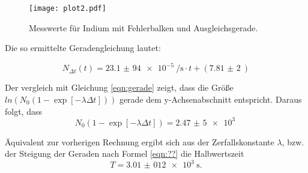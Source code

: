 \begin{figure}[H]
  \centering
  \texttt{[image: plot2.pdf]}
  \caption{Messwerte für Indium mit Fehlerbalken und Ausgleichsgerade.}
  \label{fig:plot2}
\end{figure}

Die so ermittelte Geradengleichung lautet:

\begin{equation*}
  N_{\Delta t}(t)=\SI{23,1(94)e-5}{\per\s}\cdot t + (\SI{7,81(2)}{})
\end{equation*}

Der vergleich mit Gleichung \ref{eqn:gerade} zeigt, dass die Größe
$ln(N_0(1-\exp{[-\lambda\Delta t]}))$ gerade dem y-Achsenabschnitt entspricht.
Daraus folgt, dass
\begin{equation*}
  N_0(1-\exp{[-\lambda\Delta t]})=\SI{2,47(5)e+3}{}
\end{equation*}

Äquivalent zur vorherigen Rechnung ergibt sich aus der Zerfallskonstante $\lambda$, bzw. der
Steigung der Geraden nach Formel \ref{eqn:??} die Halbwertszeit
\begin{equation*}
  T=\SI{3,01(012)e+3}{\s}.
\end{equation*}
